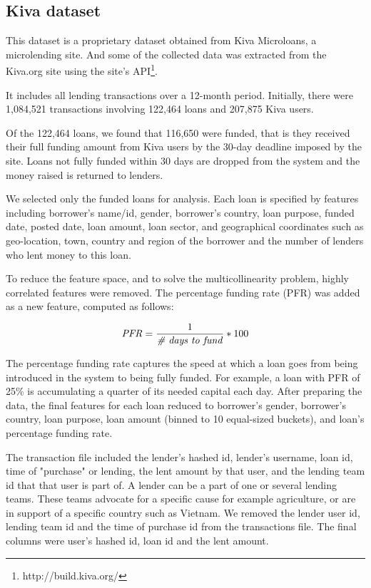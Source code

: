     \subsection{Kiva dataset}
    This dataset is a proprietary dataset obtained from Kiva Microloans, a microlending site. And some of the collected data was extracted from the Kiva.org site using the site's API\footnote{http://build.kiva.org/}.
    
    It includes all lending transactions over a 12-month period. Initially, there were 1,084,521 transactions involving 122,464 loans and 207,875 Kiva users.
    
    Of the 122,464 loans, we found that 116,650 were funded, that is they received their full funding amount from Kiva users by the 30-day deadline imposed by the site. Loans not fully funded within 30 days are dropped from the system and the money raised is returned to lenders.
    
    We selected only the funded loans for analysis. Each loan is specified by features including borrower's name/id, gender, borrower's country, loan purpose, funded date, posted date, loan amount, loan sector, and geographical coordinates such as geo-location, town, country and region of the borrower and the number of lenders who lent money to this loan.
    
    
    To reduce the feature space, and to solve the multicollinearity problem, highly correlated features were removed. The percentage funding rate (PFR) was added as a new feature, computed as follows:
    
    \begin{equation}
     \mbox{\textit{PFR}} =  \frac{1}{\mbox{\textit{{\#} days to fund}}} * 100 
    \end{equation}
    
    The percentage funding rate captures the speed at which a loan goes from being introduced in the system to being fully funded. For example, a loan with PFR of 25\% is accumulating a quarter of its needed capital each day. After preparing the data, the final features for each loan reduced to borrower's gender, borrower's country, loan purpose, loan amount (binned to 10 equal-sized buckets), and loan's percentage funding rate. 
    
    The transaction file included the lender's hashed id, lender's username, loan id, time of "purchase" or lending, the lent amount by that user, and the lending team id that that user is part of. A lender can be a part of one or several lending teams. These teams advocate for a specific cause for example agriculture, or are in support of a specific country such as Vietnam. We removed the lender user id, lending team id and the time of purchase id from the transactions file. The final columns were user's hashed id, loan id and the lent amount.
    
